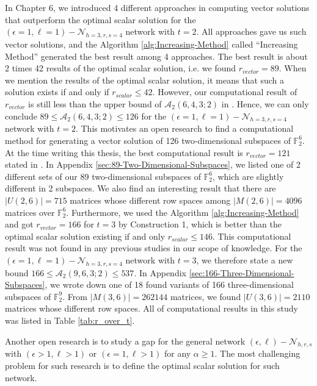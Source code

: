 In Chapter 6, we introduced 4 different approaches in computing vector
solutions that outperform the optimal scalar solution for the $\left(\epsilon=1,\ell=1\right)-\mathcal{N}_{h=3,r,s=4}$
network with $t=2$. All approaches gave us such vector solutions,
and the Algorithm \ref{alg:Increasing-Method} called ``Increasing
Method'' generated the best result among 4 approaches. The best result
is about 2 times 42 results of the optimal scalar solution, i.e. we
found $r_{vector}=89$. When we mention the results of the optimal
scalar solution, it means that such a solution exists if and only
if $r_{scalar}\leq42$. However, our computational result of $r_{vector}$
is still less than the upper bound of $\mathcal{A}_{2}\left(6,4,3;2\right)$
in \cite{Etzion:2018}. Hence, we can only conclude $89\leq\mathcal{A}_{2}\left(6,4,3;2\right)\leq126$
for the $\left(\epsilon=1,\ell=1\right)-\mathcal{N}_{h=3,r,s=4}$
network with $t=2$. This motivates an open research to find a computational
method for generating a vector solution of 126 two-dimensional subspaces
of $\ensuremath{\mathbb{F}}_{2}^{6}$. At the time writing this thesis,
the best computational result is $r_{vector}=121$ stated in \cite{Etzion:2018}.
In Appendix \ref{sec:89-Two-Dimensional-Subspaces}, we listed one
of 2 different sets of our 89 two-dimensional subspaces of $\ensuremath{\mathbb{F}}_{2}^{6}$,
which are slightly different in 2 subspaces. We also find an interesting
result that there are $\left|U(2,6)\right|=715$ matrices whose different
row spaces among $\left|M(2,6)\right|=4096$ matrices over $\ensuremath{\mathbb{F}}_{2}^{6}$.
Furthermore, we used the Algorithm \ref{alg:Increasing-Method} and
got $r_{vector}=166$ for $t=3$ by Construction 1, which is better
than the optimal scalar solution existing if and only $r_{scalar}\leq146$.
This computational result was not found in any previous studies in
our scope of knowledge. For the $\left(\epsilon=1,\ell=1\right)-\mathcal{N}_{h=3,r,s=4}$
network with $t=3$, we therefore state a new bound $166\leq\mathcal{A}_{2}\left(9,6,3;2\right)\leq537$.
In Appendix \ref{sec:166-Three-Dimensional-Subspaces}, we wrote down
one of 18 found variants of 166 three-dimensional subspaces of $\ensuremath{\mathbb{F}}_{2}^{9}$.
From $\left|M(3,6)\right|=262144$ matrices, we found $\left|U(3,6)\right|=2110$
matrices whose different row spaces. All of computational results
in this study was listed in Table \ref{tab:r_over_t}. 

Another open research is to study a gap for the general network $\left(\epsilon,\ell\right)-\mathcal{N}_{h,r,s}$
with $\left(\epsilon>1,\ell>1\right)$ or $\left(\epsilon=1,\ell>1\right)$
for any $\alpha\geq1$. The most challenging problem for such research
is to define the optimal scalar solution for such network.

\clearpage